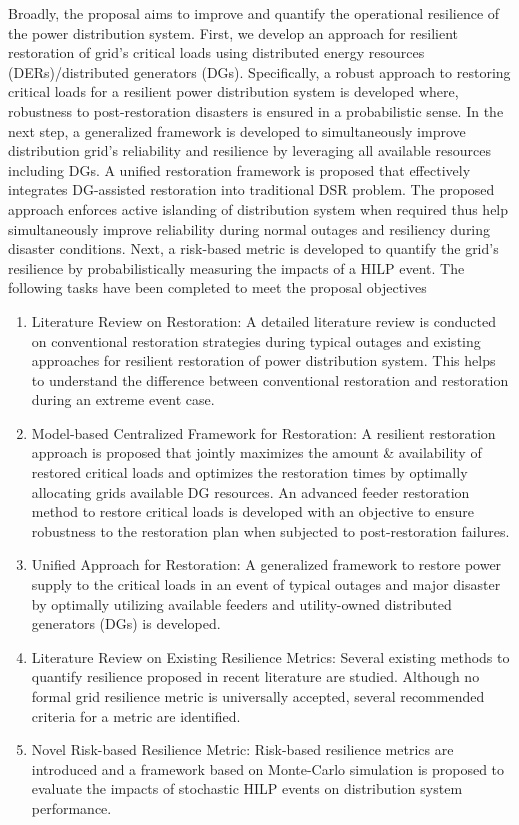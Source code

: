 \documentclass[12pt]{article}
\begin{document}
Broadly, the proposal aims to improve and quantify the operational resilience of the power distribution system. First, we develop an approach for resilient restoration of grid's critical loads using distributed energy resources (DERs)/distributed generators (DGs). Specifically, a robust approach to restoring critical loads for a resilient power distribution system is developed where, robustness to post-restoration disasters is ensured in a probabilistic sense. In the next step, a generalized framework is developed to simultaneously improve distribution grid's reliability and resilience by leveraging all available resources including DGs. A unified restoration framework is proposed that effectively integrates DG-assisted restoration into traditional DSR problem. The proposed approach enforces active islanding of distribution system  when required thus help simultaneously improve reliability during normal outages and resiliency during disaster conditions.  Next, a risk-based metric is developed to quantify the grid's resilience by probabilistically measuring the impacts of a HILP event. The following tasks have been completed to meet the proposal objectives 
\begin{enumerate}
    \item Literature Review on Restoration: A detailed literature review is conducted on conventional restoration strategies during typical outages and existing approaches for resilient restoration of power distribution system. This helps to understand the difference between conventional restoration and restoration during an extreme event case.
    \item Model-based Centralized Framework for Restoration: A resilient restoration approach is proposed that jointly maximizes the amount \& availability of restored critical loads and optimizes the restoration times by optimally allocating grids available DG resources. An advanced feeder restoration method to restore critical loads is developed with an objective to ensure robustness to the restoration plan when subjected to post-restoration failures.
    \item Unified Approach for Restoration: A generalized framework to restore power supply to the critical loads in an event of typical outages and major disaster by optimally utilizing available feeders and utility-owned distributed generators (DGs) is developed.
    \item  Literature Review on Existing Resilience Metrics: Several existing methods to quantify resilience proposed in recent literature are studied. Although no formal grid resilience metric is universally accepted, several recommended criteria for a metric are identified.
    \item Novel Risk-based Resilience Metric: Risk-based resilience metrics are introduced and a framework based on Monte-Carlo simulation is proposed to evaluate the impacts of stochastic HILP events on distribution system performance. 
\end{enumerate}
\end{document}

